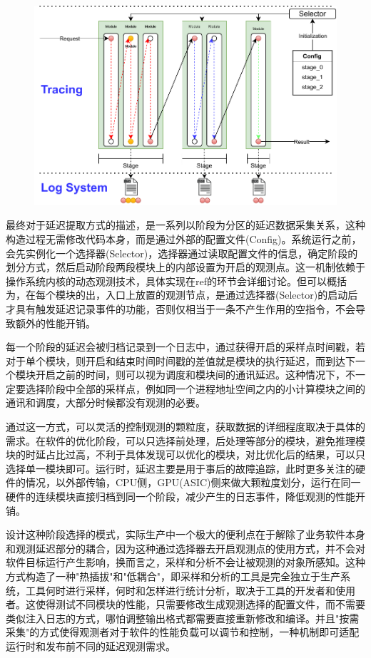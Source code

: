 \documentclass[master]{shtthesis}
\begin{document}
\begin{figure}[htbp]
	\centering
	\includegraphics[width=12cm]{img/trace.pdf}
	\label{论文观测机制示意图}
\end{figure}

最终对于延迟提取方式的描述，是一系列以阶段为分区的延迟数据采集关系，这种构造过程无需修改代码本身，而是通过外部的配置文件(Config)。系统运行之前，会先实例化一个选择器(Selector)，选择器通过读取配置文件的信息，确定阶段的划分方式，然后启动阶段两段模块上的内部设置为开启的观测点\cite{论文观测机制示意图}。这一机制依赖于操作系统内核的动态观测技术，具体实现在ref的环节会详细讨论。但可以概括为，在每个模块的出，入口上放置的观测节点，是通过选择器(Selector)的启动后才具有触发延迟记录事件的功能，否则仅相当于一条不产生作用的空指令，不会导致额外的性能开销。

每一个阶段的延迟会被归档记录到一个日志中，通过获得开启的采样点时间戳，若对于单个模块，则开启和结束时间时间戳的差值就是模块的执行延迟，而到达下一个模块开启之前的时间，则可以视为调度和模块间的通讯延迟。这种情况下，不一定要选择阶段中全部的采样点，例如同一个进程地址空间之内的小计算模块之间的通讯和调度，大部分时候都没有观测的必要。


通过这一方式，可以灵活的控制观测的颗粒度，获取数据的详细程度取决于具体的需求。在软件的优化阶段，可以只选择前处理，后处理等部分的模块，避免推理模块的时延占比过高，不利于具体发现可以优化的模块，对比优化后的结果，可以只选择单一模块即可。运行时，延迟主要是用于事后的故障追踪，此时更多关注的硬件的情况，以外部传输，CPU侧，GPU(ASIC)侧来做大颗粒度划分，运行在同一硬件的连续模块直接归档到同一个阶段，减少产生的日志事件，降低观测的性能开销。

设计这种阶段选择的模式，实际生产中一个极大的便利点在于解除了业务软件本身和观测延迟部分的耦合，因为这种通过选择器去开启观测点的使用方式，并不会对软件目标运行产生影响，换而言之，采样和分析不会让被观测的对象所感知。这种方式构造了一种"热插拔"和"低耦合"，即采样和分析的工具是完全独立于生产系统，工具何时进行采样，何时和怎样进行统计分析，取决于工具的开发者和使用者。这使得测试不同模块的性能，只需要修改生成观测选择的配置文件，而不需要类似注入日志的方式，哪怕调整输出格式都需要直接重新修改和编译。并且"按需采集"的方式使得观测者对于软件的性能负载可以调节和控制，一种机制即可适配运行时和发布前不同的延迟观测需求。
\end{document}
